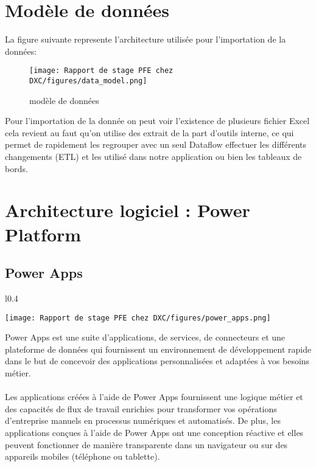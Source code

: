 \newpage
\section{Modèle de données}

La figure suivante represente l'architecture utilisée pour l'importation de la données: 
\begin{figure}[!h]
    \centering
    \texttt{[image: Rapport de stage PFE chez DXC/figures/data\_model.png]}
    \caption{modèle de données}
\end{figure}

Pour l'importation de la donnée on peut voir l'existence de plusieurs fichier Excel cela revient au faut qu'on utilise des extrait de la part d'outils interne, ce qui permet de rapidement les regrouper avec un seul Dataflow effectuer les différents changements (ETL) et les utilisé dans notre application ou bien les tableaux de bords.

\newpage

\section{Architecture logiciel : Power Platform }

\subsection{Power Apps }
\vspace{0.5cm}

\begin{wrapfigure}{l}{0.4\textwidth}
  \begin{center}
    \texttt{[image: Rapport de stage PFE chez DXC/figures/power\_apps.png]}
  \end{center}
\end{wrapfigure}

Power Apps est une suite d’applications, de services, de connecteurs et une plateforme de données qui fournissent un environnement de développement rapide dans le but de concevoir des applications personnalisées et adaptées à vos besoins métier.
\\
\\
Les applications créées à l’aide de Power Apps fournissent une logique métier et des capacités de flux de travail enrichies pour transformer vos opérations d’entreprise manuels en processus numériques et automatisés. De plus, les applications conçues à l’aide de Power Apps ont une conception réactive et elles peuvent fonctionner de manière transparente dans un navigateur ou sur des appareils mobiles (téléphone ou tablette).


